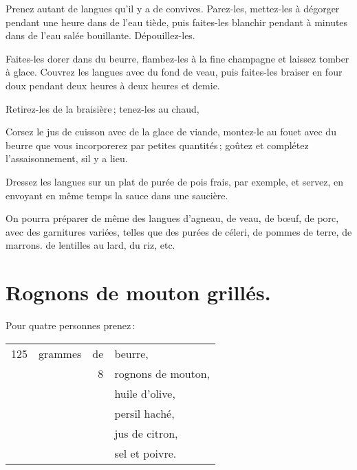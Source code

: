 Prenez autant de langues qu'il y a de convives. Parez-les, mettez-les à dégorger
pendant une heure dans de l'eau tiède, puis faites-les blanchir pendant {\mmm} à
{\mmm} minutes dans de l’eau salée bouillante. Dépouillez-les.

Faites-les dorer dans du beurre, flambez-les à la fine champagne et laissez
tomber à glace. Couvrez les langues avec du fond de veau, puis faites-les braiser
en four doux pendant deux heures à deux heures et demie.

Retirez-les de la braisière ; tenez-les au chaud,

Corsez le jus de cuisson avec de la glace de viande, montez-le au fouet avec du
beurre que vous incorporerez par petites quantités ; goûtez et complétez
l'assaisonnement, sil y a lieu.

Dressez les langues sur un plat de purée de pois frais, par exemple, et servez,
en envoyant en même temps la sauce dans une saucière.

\sk

On pourra préparer de même des langues d'agneau, de veau, de bœuf, de porc,
avec des garnitures variées, telles que des purées de céleri, de pommes de terre,
de marrons. de lentilles au lard, du riz, etc.

\section*{\centering Rognons de mouton grillés.}
{}

Pour quatre personnes prenez :

\medskip

\footnotesize
\begin{longtable}{rrrp{18em}}
    125 & grammes & de & beurre,                                                                          \\
        &         &  8 & rognons de mouton,                                                               \\
        &         &    & huile d'olive,                                                                   \\
        &         &    & persil haché,                                                                    \\
        &         &    & jus de citron,                                                                   \\
        &         &    & sel et poivre.                                                                   \\
\end{longtable}
\normalsize

